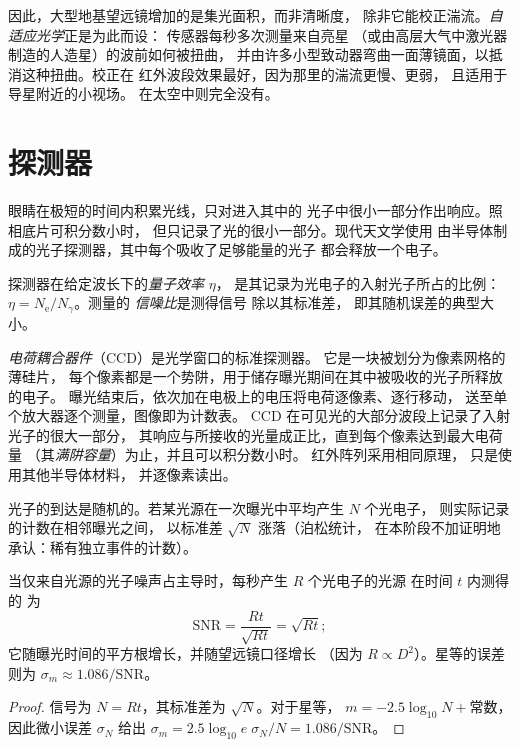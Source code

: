 因此，大型地基望远镜增加的是集光面积，而非清晰度，
除非它能校正湍流。\emph{自适应光学}正是为此而设：
传感器每秒多次测量来自亮星
（或由高层大气中激光器制造的人造星）的波前如何被扭曲，
并由许多小型致动器弯曲一面薄镜面，以抵消这种扭曲。校正在
红外波段效果最好，因为那里的湍流更慢、更弱，
且适用于导星附近的小视场。
在太空中则完全没有。

\section{探测器}

眼睛在极短的时间内积累光线，只对进入其中的
光子中很小一部分作出响应。照相底片可积分数小时，
但只记录了光的很小一部分。现代天文学使用
由半导体制成的光子探测器，其中每个吸收了足够能量的光子
都会释放一个电子。

\begin{definition}\label{def:b1:observing-the-sky:detector}
探测器在给定波长下的\emph{量子效率} $\eta$，
是其记录为光电子的入射光子所占的比例：
$\eta = N_\mathrm{e}/N_\gamma$。测量的
\emph{信噪比}是测得信号
除以其标准差，
即其随机误差的典型大小。
\end{definition}

\emph{电荷耦合器件}（CCD）是光学窗口的标准探测器。
它是一块被划分为像素网格的薄硅片，
每个像素都是一个势阱，用于储存曝光期间在其中被吸收的光子所释放的电子。
曝光结束后，依次加在电极上的电压将电荷逐像素、逐行移动，
送至单个放大器逐个测量，图像即为计数表。
CCD 在可见光的大部分波段上记录了入射光子的很大一部分，
其响应与所接收的光量成正比，直到每个像素达到最大电荷量
（其\emph{满阱容量}）为止，并且可以积分数小时。
红外阵列采用相同原理，
只是使用其他半导体材料，
并逐像素读出。

光子的到达是随机的。若某光源在一次曝光中平均产生 $N$ 个光电子，
则实际记录的计数在相邻曝光之间，
以标准差 $\sqrt N$ 涨落（泊松统计，
在本阶段不加证明地承认：稀有独立事件的计数）。

\begin{proposition}[光子噪声]\label{prop:b1:observing-the-sky:snr}
当仅来自光源的光子噪声占主导时，每秒产生 $R$ 个光电子的光源
在时间 $t$ 内测得的
为
\[
  \mathrm{SNR} = \frac{Rt}{\sqrt{Rt}} = \sqrt{Rt} ;
\]
它随曝光时间的平方根增长，并随望远镜口径增长
（因为 $R \propto D^2$）。星等的误差则为
$\sigma_m \approx 1.086/\mathrm{SNR}$。
\end{proposition}

\begin{proof}
信号为 $N = Rt$，其标准差为 $\sqrt N$。对于星等，
$m = -2.5\log_{10}N + \text{常数}$，因此微小误差 $\sigma_N$
给出 $\sigma_m = 2.5\log_{10}e\;\sigma_N/N = 1.086/\mathrm{SNR}$。
\end{proof}

